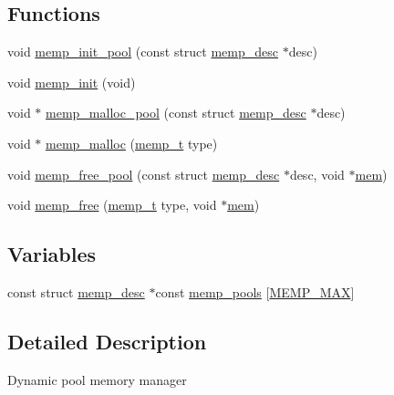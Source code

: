 \subsection*{Functions}
\begin{DoxyCompactItemize}
\item 
void \hyperlink{openmote-cc2538_2lwip_2src_2core_2memp_8c_a6416303426d05526bed33f241fa6ecd7}{memp\+\_\+init\+\_\+pool} (const struct \hyperlink{structmemp__desc}{memp\+\_\+desc} $\ast$desc)
\item 
void \hyperlink{openmote-cc2538_2lwip_2src_2core_2memp_8c_a9693e5b1ac2c6b9c0e7870522d45efa2}{memp\+\_\+init} (void)
\item 
void $\ast$ \hyperlink{openmote-cc2538_2lwip_2src_2core_2memp_8c_a348c83ee972f1edf7296a1cdf1d75f22}{memp\+\_\+malloc\+\_\+pool} (const struct \hyperlink{structmemp__desc}{memp\+\_\+desc} $\ast$desc)
\item 
void $\ast$ \hyperlink{openmote-cc2538_2lwip_2src_2core_2memp_8c_a2b00593d086313c267b54a976bf67aa5}{memp\+\_\+malloc} (\hyperlink{native_2lwip_2src_2include_2lwip_2memp_8h_a85a164b1f7764951cc685ea525114e57}{memp\+\_\+t} type)
\item 
void \hyperlink{openmote-cc2538_2lwip_2src_2core_2memp_8c_a62f8c3c907743e34eee3cdac7fa1eaa5}{memp\+\_\+free\+\_\+pool} (const struct \hyperlink{structmemp__desc}{memp\+\_\+desc} $\ast$desc, void $\ast$\hyperlink{structmem}{mem})
\item 
void \hyperlink{openmote-cc2538_2lwip_2src_2core_2memp_8c_aecd94926b7c2a0e23ae195f4ae97581f}{memp\+\_\+free} (\hyperlink{native_2lwip_2src_2include_2lwip_2memp_8h_a85a164b1f7764951cc685ea525114e57}{memp\+\_\+t} type, void $\ast$\hyperlink{structmem}{mem})
\end{DoxyCompactItemize}
\subsection*{Variables}
\begin{DoxyCompactItemize}
\item 
const struct \hyperlink{structmemp__desc}{memp\+\_\+desc} $\ast$const \hyperlink{openmote-cc2538_2lwip_2src_2core_2memp_8c_ad78a1f656a766f2c6341aa466762b883}{memp\+\_\+pools} \mbox{[}\hyperlink{openmote-cc2538_2lwip_2src_2include_2lwip_2memp_8h_a85a164b1f7764951cc685ea525114e57a3387042084427642949f3223c7ddd321}{M\+E\+M\+P\+\_\+\+M\+AX}\mbox{]}
\end{DoxyCompactItemize}


\subsection{Detailed Description}
Dynamic pool memory manager

